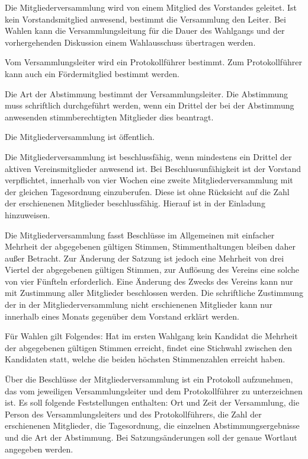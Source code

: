 \documentclass[parskip]{scrartcl}
\begin{document}
\begin{contract}
\label{beschlussfassung-der-mitgliederversammlung}

Die Mitgliederversammlung wird von einem Mitglied des Vorstandes geleitet. Ist kein Vorstandsmitglied anwesend, bestimmt die Versammlung den Leiter. Bei Wahlen kann die Versammlungsleitung für die Dauer des Wahlgangs und der vorhergehenden Diskussion einem Wahlausschuss übertragen werden.

Vom Versammlungsleiter wird ein Protokollführer bestimmt. Zum Protokollführer kann auch ein Fördermitglied bestimmt werden.

Die Art der Abstimmung bestimmt der Versammlungsleiter. Die Abstimmung muss schriftlich durchgeführt werden, wenn ein Drittel der bei der Abstimmung anwesenden stimmberechtigten Mitglieder dies beantragt.

Die Mitgliederversammlung ist öffentlich.

Die Mitgliederversammlung ist beschlussfähig, wenn mindestens ein Drittel der aktiven Vereinsmitglieder anwesend ist. Bei Beschlussunfähigkeit ist der Vorstand verpflichtet, innerhalb von vier Wochen eine zweite Mitgliederversammlung mit der gleichen Tagesordnung einzuberufen. Diese ist ohne Rücksicht auf die Zahl der erschienenen Mitglieder beschlussfähig. Hierauf ist in der Einladung hinzuweisen.

Die Mitgliederversammlung fasst Beschlüsse im Allgemeinen mit einfacher Mehrheit der abgegebenen gültigen Stimmen, Stimmenthaltungen bleiben daher außer Betracht. Zur Änderung der Satzung ist jedoch eine Mehrheit von drei Viertel der abgegebenen gültigen Stimmen, zur Auflösung des Vereins eine solche von vier Fünfteln erforderlich. Eine Änderung des Zwecks des Vereins kann nur mit Zustimmung aller Mitglieder beschlossen werden. Die schriftliche Zustimmung der in der Mitgliederversammlung nicht erschienenen Mitglieder kann nur innerhalb eines Monats gegenüber dem Vorstand erklärt werden.

Für Wahlen gilt Folgendes: Hat im ersten Wahlgang kein Kandidat die Mehrheit der abgegebenen gültigen Stimmen erreicht, findet eine Stichwahl zwischen den Kandidaten statt, welche die beiden höchsten Stimmenzahlen erreicht haben.

Über die Beschlüsse der Mitgliederversammlung ist ein Protokoll aufzunehmen, das vom jeweiligen Versammlungsleiter und dem Protokollführer zu unterzeichnen ist. Es soll folgende Feststellungen enthalten: Ort und Zeit der Versammlung, die Person des Versammlungsleiters und des Protokollführers, die Zahl der erschienenen Mitglieder, die Tagesordnung, die einzelnen Abstimmungsergebnisse und die Art der Abstimmung. Bei Satzungsänderungen soll der genaue Wortlaut angegeben werden.


\end{contract}
\end{document}
